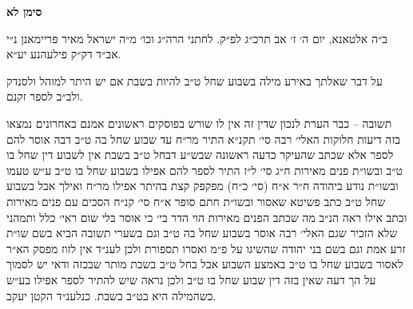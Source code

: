 \documentclass[12pt, openany]{book}
\newcommand{\chapname}{}
\newcommand{\newchap}[1]{
	\addcontentsline{toc}{chapter}{#1}
	\renewcommand{\chapname}{#1}
		\begin{center}
			\textbf{%
\fontsize{16pt}{16pt}\selectfont
				#1}
		\end{center}
}
\begin{document}
\newchap{סימן לא}
\begin{multicols}{2}
ב״ה אלטאנא, יום ה׳ ז׳ אב תרכ״ג לפ״ק. לחתני הרה״ג וכו׳ מ״ה ישראל מאיר פריימאנן נ״י אב״ד דק״ק פילעהנע יע״א.\\\vspace{0pt}

על דבר שאלתך באירע מילה בשבוע שחל ט״ב להיות בשבת אם יש היתר למוהל ולסנדק ולב״ב לספר זקנם.\\\vspace{0pt}

תשובה – כבר הערת לנכון שדין זה אין לו שורש בפוסקים ראשונים אמנם באחרונים נמצאו בזה דיעות חלוקות האלי׳ רבה סי׳ תקנ״א התיר מר״ח עד שבוע שחל בה ט״ב דבה אוסר להם לספר אלא שכתב שהעיקר כדעה ראשונה שבש״ע דבחל ט״ב בשבת אין לשבוע דין שחל בו ט״ב ובשו״ת פנים מאירות ח״ג סי׳ ל״ז התיר לספר להם אפילו בשבוע שחל בו ט״ב ע״ש טעמו ובשו״ת נודע ביהודה ח״ר א״ח (סי׳ כ״ח) מפקפק קצת בהיתר אפילו מר״ח ואילך אבל בשבוע שחל ט״ב כתב פשיטא שאסור ובשו״ת חתם סופר א״ח סי׳ קנ״ח הסכים עם פנים מאירות וכתב אילו ראה הנ״ב מה שכתב הפנים מאירות הוי הדר בי׳ כי אוסר בלי שום ראי׳ כלל ותמהני שלא הזכיר שגם האלי׳ רבה אוסר בשבוע שחל בה ט״ב וגם בשערי תשובה הביא בשם שו״ת זרע אמת וגם בשם בני יהודה שהשיגו על פ״מ ואסרו תספורת ולכן לענ״ד אין לזוז מפסק הא״ר לאסור בשבוע שחל בו ט״ב באמצע השבוע אבל בחל ט״ב בשבת מותר שבכזה ודאי יש לסמוך על הך דעה שאין בזה דין שבוע שחל בו ט״ב ולכן נראה שיש להתיר לספר אפילו בע״ש כשהמילה היא בט״ב בשבת. כנלענ״ד הקטן יעקב.\\\vspace{0pt}

\end{multicols}\newpage
\end{document}

